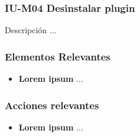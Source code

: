 
\subsubsection{IU-M04 Desinstalar plugin}

 Descripción ...


\subsubsection{Elementos Relevantes}

    \begin{itemize}
    \item {\bf Lorem ipsum}
        ...
    \end{itemize}

\subsubsection{Acciones relevantes}

    \begin{itemize}
    \item {\bf Lorem ipsum}
        ...
    \end{itemize}

\clearpage
